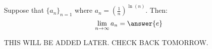 \documentclass{ximera}
\author{Jim Talamo}
\begin{document}
\begin{exercise}

Suppose that $\{a_n \}_{n=1}$ where $a_n =\left(\frac{1}{n}\right)^{\ln(n)}$.  Then:
\[
\lim_{n \to \infty} a_n = \answer{e}
\]

\begin{hint}
THIS WILL BE ADDED LATER.  CHECK BACK TOMORROW.
\end{hint}

\end{exercise}
\end{document}
